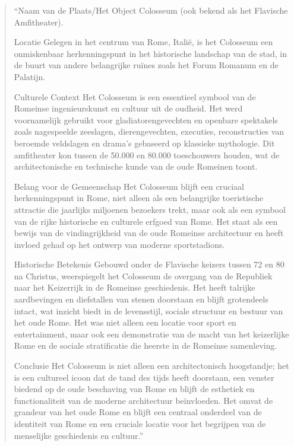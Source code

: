 \begin{quote}
“Naam van de Plaats/Het Object
Colosseum (ook bekend als het Flavische Amfitheater).

Locatie
Gelegen in het centrum van Rome, Italië, is het Colosseum een onmiskenbaar herkenningspunt in het historische landschap van de stad, in de buurt van andere belangrijke ruïnes zoals het Forum Romanum en de Palatijn.

Culturele Context
Het Colosseum is een essentieel symbool van de Romeinse ingenieurskunst en cultuur uit de oudheid. Het werd voornamelijk gebruikt voor gladiatorengevechten en openbare spektakels zoals nagespeelde zeeslagen, dierengevechten, executies, reconstructies van beroemde veldslagen en drama’s gebaseerd op klassieke mythologie. Dit amfitheater kon tussen de 50.000 en 80.000 toeschouwers houden, wat de architectonische en technische kunde van de oude Romeinen toont.

Belang voor de Gemeenschap
Het Colosseum blijft een cruciaal herkenningspunt in Rome, niet alleen als een belangrijke toeristische attractie die jaarlijks miljoenen bezoekers trekt, maar ook als een symbool van de rijke historische en culturele erfgoed van Rome. Het staat als een bewijs van de vindingrijkheid van de oude Romeinse architectuur en heeft invloed gehad op het ontwerp van moderne sportstadions.

Historische Betekenis
Gebouwd onder de Flavische keizers tussen 72 en 80 na Christus, weerspiegelt het Colosseum de overgang van de Republiek naar het Keizerrijk in de Romeinse geschiedenis. Het heeft talrijke aardbevingen en diefstallen van stenen doorstaan en blijft grotendeels intact, wat inzicht biedt in de levensstijl, sociale structuur en bestuur van het oude Rome. Het was niet alleen een locatie voor sport en entertainment, maar ook een demonstratie van de macht van het keizerlijke Rome en de sociale stratificatie die heerste in de Romeinse samenleving.

Conclusie
Het Colosseum is niet alleen een architectonisch hoogstandje; het is een cultureel icoon dat de tand des tijds heeft doorstaan, een venster biedend op de oude beschaving van Rome en blijft de esthetiek en functionaliteit van de moderne architectuur beïnvloeden. Het omvat de grandeur van het oude Rome en blijft een centraal onderdeel van de identiteit van Rome en een cruciale locatie voor het begrijpen van de menselijke geschiedenis en cultuur.”
\end{quote}

